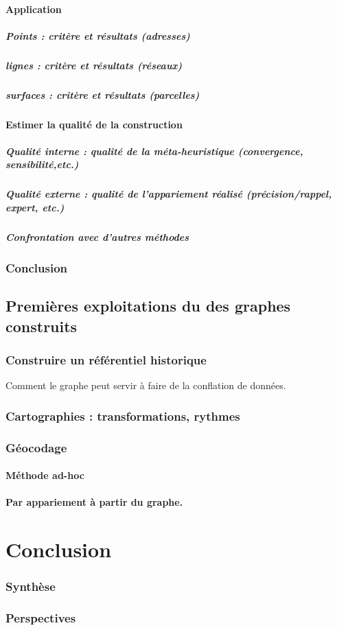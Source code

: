 \documentclass[a4paper,10pt]{article}
\begin{document}
\paragraph{Application}
\subparagraph{Points : critère et résultats (adresses)}

\subparagraph{lignes : critère et résultats (réseaux)}

\subparagraph{surfaces : critère et résultats (parcelles)}


\paragraph{Estimer la qualité de la construction}
\subparagraph{ Qualité interne : qualité de la méta-heuristique (convergence, sensibilité,etc.)}

\subparagraph{Qualité externe : qualité de l'appariement réalisé (précision/rappel, expert, etc.)}

\subparagraph{Confrontation avec d'autres méthodes }



\subsubsection{Conclusion}


\subsection{Premières exploitations du des graphes construits}
\subsubsection{Construire un référentiel historique}
Comment le graphe peut servir à faire de la conflation de données.

\subsubsection{Cartographies : transformations, rythmes}
\subsubsection{Géocodage}
\paragraph{Méthode ad-hoc}
\paragraph{Par appariement à partir du graphe.}

\section{Conclusion}
\subsubsection{Synthèse}
\subsubsection{Perspectives}
\end{document}
